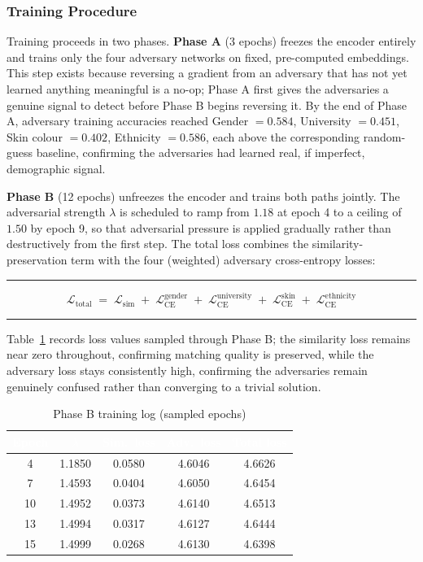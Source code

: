 \documentclass[11pt,a4paper]{article}
\newcommand{\hdrow}{\rowcolor{TPnavy}}
\newcommand{\hdtxt}[1]{\textcolor{white}{\bfseries #1}}
\newenvironment{formulabox}
  {\begin{center}\color{TPteal}\rule{0.92\linewidth}{0.8pt}\par\vspace{5pt}\color{TPnavy}}
  {\par\vspace{3pt}\color{TPteal}\rule{0.92\linewidth}{0.8pt}\end{center}}
\begin{document}
\subsubsection{Training Procedure}

Training proceeds in two phases. \textbf{Phase A} (3 epochs) freezes the encoder entirely and trains only the four adversary networks on fixed, pre-computed embeddings. This step exists because reversing a gradient from an adversary that has not yet learned anything meaningful is a no-op; Phase A first gives the adversaries a genuine signal to detect before Phase B begins reversing it. By the end of Phase A, adversary training accuracies reached Gender $=0.584$, University $=0.451$, Skin colour $=0.402$, Ethnicity $=0.586$, each above the corresponding random-guess baseline, confirming the adversaries had learned real, if imperfect, demographic signal.

\textbf{Phase B} (12 epochs) unfreezes the encoder and trains both paths jointly. The adversarial strength $\lambda$ is scheduled to ramp from $1.18$ at epoch 4 to a ceiling of $1.50$ by epoch 9, so that adversarial pressure is applied gradually rather than destructively from the first step. The total loss combines the similarity-preservation term with the four (weighted) adversary cross-entropy losses:

\begin{formulabox}
\begin{equation}
\label{eq:total-loss}
\mathcal{L}_{\text{total}} \;=\; \mathcal{L}_{\text{sim}} \;+\; \mathcal{L}^{\text{gender}}_{\text{CE}} \;+\; \mathcal{L}^{\text{university}}_{\text{CE}} \;+\; \mathcal{L}^{\text{skin}}_{\text{CE}} \;+\; \mathcal{L}^{\text{ethnicity}}_{\text{CE}}
\end{equation}
\end{formulabox}

Table~\ref{tab:mod1-trainlog} records loss values sampled through Phase B; the similarity loss remains near zero throughout, confirming matching quality is preserved, while the adversary loss stays consistently high, confirming the adversaries remain genuinely confused rather than converging to a trivial solution.

\begin{table}[H]
\centering
\caption{Phase B training log (sampled epochs)}
\label{tab:mod1-trainlog}
\small
\begin{tabular}{ccccc}
\toprule
\hdrow \hdtxt{Epoch} & \hdtxt{$\lambda$} & \hdtxt{Sim.\ loss} & \hdtxt{Adv.\ loss} & \hdtxt{Total loss} \\
\midrule
4 & 1.1850 & 0.0580 & 4.6046 & 4.6626 \\
\rowcolor{TPlight}
7 & 1.4593 & 0.0404 & 4.6050 & 4.6454 \\
10 & 1.4952 & 0.0373 & 4.6140 & 4.6513 \\
\rowcolor{TPlight}
13 & 1.4994 & 0.0317 & 4.6127 & 4.6444 \\
15 & 1.4999 & 0.0268 & 4.6130 & 4.6398 \\
\bottomrule
\end{tabular}
\end{table}
\end{document}
